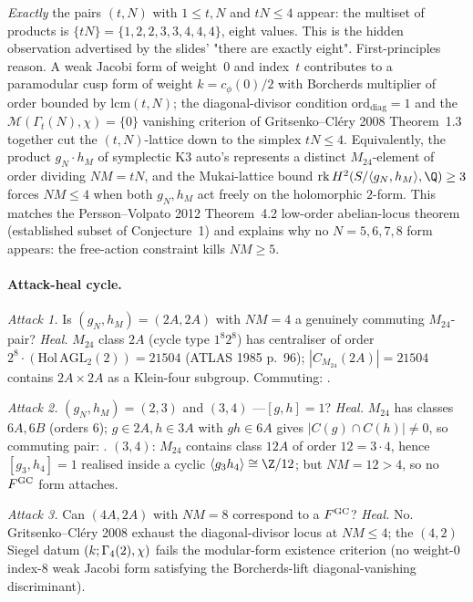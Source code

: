 \emph{Exactly} the pairs $(t,N)$ with $1\leq t,N$ and $tN\leq 4$
appear: the multiset of products is
$\{tN\}=\{1,2,2,3,3,4,4,4\}$, eight values.  This is the hidden
observation advertised by the slides' "there are exactly eight".
First-principles reason.  A weak Jacobi form of weight~$0$ and
index~$t$ contributes to a paramodular cusp form of weight
$k=c_\phi(0)/2$ with Borcherds multiplier of order bounded by
$\mathrm{lcm}(t,N)$; the diagonal-divisor condition
$\mathrm{ord}_{\mathrm{diag}}=1$ and the
$\mathcal{M}(\Gamma_t(N),\chi)=\{0\}$ vanishing criterion of
Gritsenko--Cl\'ery 2008 Theorem~1.3 together cut the $(t,N)$-lattice
down to the simplex $tN\leq 4$.  Equivalently, the product
$g_N\cdot h_M$ of symplectic K3 auto's represents a distinct
$M_{24}$-element of order dividing $NM=tN$, and the Mukai-lattice
bound $\mathrm{rk}\,H^2(S/\langle g_N,h_M\rangle,\Q)\geq 3$ forces
$NM\leq 4$ when both $g_N,h_M$ act freely on the holomorphic
$2$-form.  This matches the Persson--Volpato 2012 Theorem~4.2
low-order abelian-locus theorem (established subset of Conjecture~1)
and explains why no $N=5,6,7,8$ form appears: the free-action
constraint kills $NM\geq 5$.

\paragraph{Attack-heal cycle.}

\emph{Attack 1.}  Is $(g_N,h_M)=(2A,2A)$ with $NM=4$ a genuinely
commuting $M_{24}$-pair?  \emph{Heal.}  $M_{24}$ class $2A$
(cycle type $1^{8}2^{8}$) has centraliser of order
$2^{8}\cdot(\text{Hol}\,\mathrm{AGL}_2(2))=21504$ (ATLAS 1985
p.~96); $|C_{M_{24}}(2A)|=21504$ contains $2A\times 2A$ as a
Klein-four subgroup.  Commuting: \ClaimStatusTheorem.

\emph{Attack 2.}  $(g_N,h_M)=(2,3)$ and $(3,4)$ ---$[g,h]=1$?
\emph{Heal.}  $M_{24}$ has classes $6A, 6B$ (orders $6$);
$g\in 2A, h\in 3A$ with $gh\in 6A$ gives $|C(g)\cap C(h)|\neq 0$,
so commuting pair: \ClaimStatusTheorem.  $(3,4)$:
$M_{24}$ contains class $12A$ of order $12=3\cdot 4$, hence
$[g_3,h_4]=1$ realised inside a cyclic $\langle g_3h_4\rangle\cong
\Z/12$; but $NM=12>4$, so no $F^{\mathrm{GC}}_{}$ form attaches.

\emph{Attack 3.}  Can $(4A,2A)$ with $NM=8$ correspond to a
$F^{\mathrm{GC}}_{}$?  \emph{Heal.}  No.  Gritsenko--Cl\'ery 2008 exhaust
the diagonal-divisor locus at $NM\leq 4$; the $(4,2)$ Siegel
datum $(k;\Gamma_{4}(2),\chi)$ fails the modular-form existence
criterion (no weight-$0$ index-$8$ weak Jacobi form satisfying
the Borcherds-lift diagonal-vanishing discriminant).

